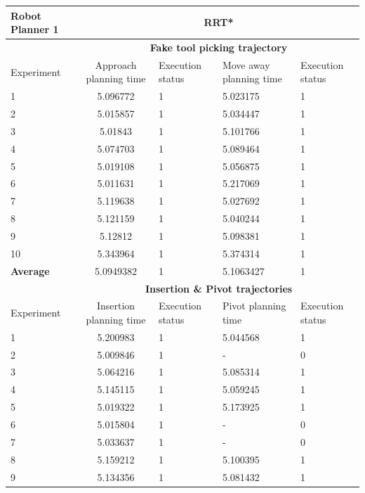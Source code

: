 \begin{table}[H]
\centering
\begin{tabular}{|p{2cm}|c|p{2cm}|p{2cm}|p{2cm}|}
\hline
Robot Planner 1           & \multicolumn{4}{c}{\textbf{RRT*}}                                                                                                 \vline \\
\hline
                          & \multicolumn{4}{c}{\textbf{Fake tool picking trajectory}}                     \vline \\
\hline
Experiment                & Approach planning time & Execution status & Move away planning time & Execution status  \\
\hline
1	& 5.096772	& 1	& 5.023175	& 1 \\
2	& 5.015857	& 1	& 5.034447	& 1 \\
3	& 5.01843	& 1	& 5.101766	& 1 \\
4	& 5.074703	& 1	& 5.089464	& 1 \\
5	& 5.019108	& 1	& 5.056875	& 1 \\
6	& 5.011631	& 1	& 5.217069	& 1 \\
7	& 5.119638	& 1	& 5.027692	& 1 \\
8	& 5.121159	& 1	& 5.040244	& 1 \\
9	& 5.12812	& 1	& 5.098381	& 1 \\
10	& 5.343964	& 1	& 5.374314	& 1 \\
\hline
\textbf{Average} & 	5.0949382	& 1	& 5.1063427	& 1 \\
\hline
                          & \multicolumn{4}{c}{\textbf{Insertion \& Pivot trajectories}}                     \vline \\
\hline
Experiment                & Insertion planning time & Execution status & Pivot planning time & Execution status  \\
\hline
1 & 5.200983  & 1 &  5.044568 &  1 \\
2 & 5.009846  & 1 &  -  &  0 \\
3 & 5.064216  & 1 &  5.085314 &  1 \\
4 & 5.145115  & 1 &  5.059245 &  1 \\
5 & 5.019322  & 1 &  5.173925 &  1 \\
6 & 5.015804  & 1 &  -  &  0 \\
7 & 5.033637  & 1 &  -  &  0 \\
8 & 5.159212  & 1 &  5.100395 &  1 \\
9 & 5.134356  & 1 &  5.081432 &  1 \\

\end{tabular}
\end{table}
